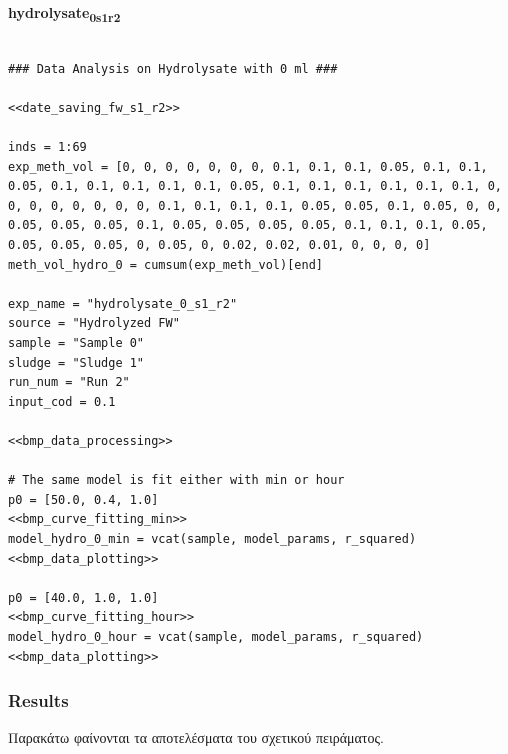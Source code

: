 \documentclass[11pt]{article}
\begin{document}
\textbf{hydrolysate\textsubscript{0}\textsubscript{s1}\textsubscript{r2}}
\begin{verbatim}

### Data Analysis on Hydrolysate with 0 ml ###

<<date_saving_fw_s1_r2>>

inds = 1:69
exp_meth_vol = [0, 0, 0, 0, 0, 0, 0, 0.1, 0.1, 0.1, 0.05, 0.1, 0.1, 0.05, 0.1, 0.1, 0.1, 0.1, 0.1, 0.05, 0.1, 0.1, 0.1, 0.1, 0.1, 0.1, 0, 0, 0, 0, 0, 0, 0, 0, 0.1, 0.1, 0.1, 0.1, 0.05, 0.05, 0.1, 0.05, 0, 0, 0.05, 0.05, 0.05, 0.1, 0.05, 0.05, 0.05, 0.05, 0.1, 0.1, 0.1, 0.05, 0.05, 0.05, 0.05, 0, 0.05, 0, 0.02, 0.02, 0.01, 0, 0, 0, 0]
meth_vol_hydro_0 = cumsum(exp_meth_vol)[end]

exp_name = "hydrolysate_0_s1_r2"
source = "Hydrolyzed FW"
sample = "Sample 0"
sludge = "Sludge 1"
run_num = "Run 2"
input_cod = 0.1

<<bmp_data_processing>>

# The same model is fit either with min or hour
p0 = [50.0, 0.4, 1.0]
<<bmp_curve_fitting_min>>
model_hydro_0_min = vcat(sample, model_params, r_squared)
<<bmp_data_plotting>>

p0 = [40.0, 1.0, 1.0]
<<bmp_curve_fitting_hour>>
model_hydro_0_hour = vcat(sample, model_params, r_squared)
<<bmp_data_plotting>>
\end{verbatim}

\subsubsection{Results}
\label{sec:orgb2aed18}
Παρακάτω φαίνονται τα αποτελέσματα του σχετικού πειράματος.
\end{document}
